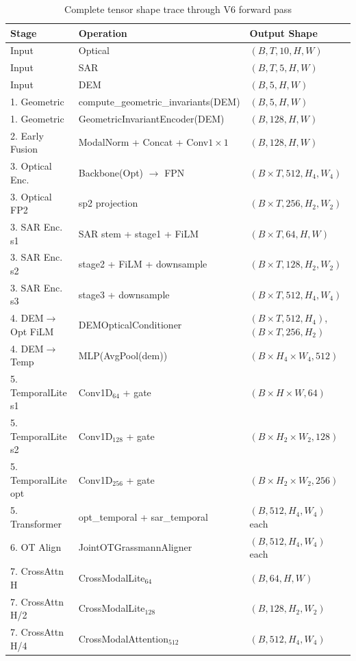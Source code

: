 \begin{table}[h]
\centering
\caption{Complete tensor shape trace through V6 forward pass}
\label{tab:shapes}
\begin{tabular}{lll}
\toprule
\textbf{Stage} & \textbf{Operation} & \textbf{Output Shape} \\
\midrule
Input & Optical & $(B, T, 10, H, W)$ \\
Input & SAR & $(B, T, 5, H, W)$ \\
Input & DEM & $(B, 5, H, W)$ \\
\midrule
1. Geometric & compute\_geometric\_invariants(DEM) & $(B, 5, H, W)$ \\
1. Geometric & GeometricInvariantEncoder(DEM) & $(B, 128, H, W)$ \\
2. Early Fusion & ModalNorm + Concat + Conv$1\times1$ & $(B, 128, H, W)$ \\
\midrule
3. Optical Enc. & Backbone(Opt) $\to$ FPN & $(B\times T, 512, H_4, W_4)$ \\
3. Optical FP2 & sp2 projection & $(B\times T, 256, H_2, W_2)$ \\
3. SAR Enc. s1 & SAR stem + stage1 + FiLM & $(B\times T, 64, H, W)$ \\
3. SAR Enc. s2 & stage2 + FiLM + downsample & $(B\times T, 128, H_2, W_2)$ \\
3. SAR Enc. s3 & stage3 + downsample & $(B\times T, 512, H_4, W_4)$ \\
\midrule
4. DEM$\to$Opt FiLM & DEMOpticalConditioner & $(B\times T, 512, H_4)$, $(B\times T, 256, H_2)$ \\
4. DEM$\to$Temp & MLP(AvgPool(dem)) & $(B\times H_4\times W_4, 512)$ \\
5. TemporalLite s1 & Conv1D$_{64}$ + gate & $(B\times H\times W, 64)$ \\
5. TemporalLite s2 & Conv1D$_{128}$ + gate & $(B\times H_2\times W_2, 128)$ \\
5. TemporalLite opt & Conv1D$_{256}$ + gate & $(B\times H_2\times W_2, 256)$ \\
5. Transformer & opt\_temporal + sar\_temporal & $(B, 512, H_4, W_4)$ each \\
\midrule
6. OT Align & JointOTGrassmannAligner & $(B, 512, H_4, W_4)$ each \\
7. CrossAttn H & CrossModalLite$_{64}$ & $(B, 64, H, W)$ \\
7. CrossAttn H/2 & CrossModalLite$_{128}$ & $(B, 128, H_2, W_2)$ \\
7. CrossAttn H/4 & CrossModalAttention$_{512}$ & $(B, 512, H_4, W_4)$ \\

\end{tabular}
\end{table}
